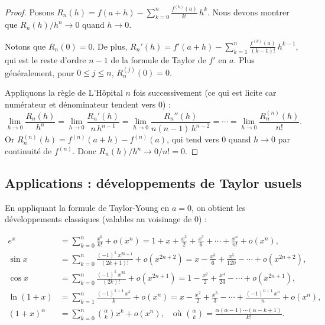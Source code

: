 \documentclass[12pt,a4paper,openany]{book}
\theoremstyle{definition}
\begin{document}
\begin{proof}
Posons $R_n(h) = f(a+h) - \displaystyle\sum_{k=0}^{n}\frac{f^{(k)}(a)}{k!}\,h^k$. Nous devons montrer que $R_n(h)/h^n \to 0$ quand $h \to 0$.

Notons que $R_n(0) = 0$. De plus, $R_n'(h) = f'(a+h) - \sum_{k=1}^{n}\frac{f^{(k)}(a)}{(k-1)!}\,h^{k-1}$, qui est le reste d'ordre $n-1$ de la formule de Taylor de $f'$ en $a$. Plus généralement, pour $0 \leqslant j \leqslant n$, $R_n^{(j)}(0) = 0$.

Appliquons la règle de L'Hôpital $n$ fois successivement (ce qui est licite car numérateur et dénominateur tendent vers $0$) :
\[
  \lim_{h \to 0} \frac{R_n(h)}{h^n}
  = \lim_{h \to 0} \frac{R_n'(h)}{n\,h^{n-1}}
  = \lim_{h \to 0} \frac{R_n''(h)}{n(n-1)\,h^{n-2}}
  = \cdots
  = \lim_{h \to 0} \frac{R_n^{(n)}(h)}{n!}.
\]
Or $R_n^{(n)}(h) = f^{(n)}(a+h) - f^{(n)}(a)$, qui tend vers $0$ quand $h \to 0$ par continuité de $f^{(n)}$. Donc $R_n(h)/h^n \to 0/n! = 0$.
\end{proof}

\subsection{Applications : développements de Taylor usuels}\label{subsec:DL-usuels}

En appliquant la formule de Taylor-Young en $a = 0$, on obtient les développements classiques (valables au voisinage de $0$) :

\begin{align}
  e^x &= \sum_{k=0}^{n} \frac{x^k}{k!} + o(x^n)
  = 1 + x + \frac{x^2}{2} + \frac{x^3}{6} + \cdots + \frac{x^n}{n!} + o(x^n), \label{eq:DL-exp} \\[6pt]
  \sin x &= \sum_{k=0}^{n} \frac{(-1)^k\,x^{2k+1}}{(2k+1)!} + o(x^{2n+2})
  = x - \frac{x^3}{6} + \frac{x^5}{120} - \cdots + o(x^{2n+2}), \label{eq:DL-sin} \\[6pt]
  \cos x &= \sum_{k=0}^{n} \frac{(-1)^k\,x^{2k}}{(2k)!} + o(x^{2n+1})
  = 1 - \frac{x^2}{2} + \frac{x^4}{24} - \cdots + o(x^{2n+1}), \label{eq:DL-cos} \\[6pt]
  \ln(1+x) &= \sum_{k=1}^{n} \frac{(-1)^{k+1}\,x^k}{k} + o(x^n)
  = x - \frac{x^2}{2} + \frac{x^3}{3} - \cdots + \frac{(-1)^{n+1}\,x^n}{n} + o(x^n), \label{eq:DL-ln} \\[6pt]
  (1+x)^\alpha &= \sum_{k=0}^{n} \binom{\alpha}{k} x^k + o(x^n), \quad
  \text{où } \binom{\alpha}{k} = \frac{\alpha(\alpha-1)\cdots(\alpha-k+1)}{k!}. \label{eq:DL-puissance}
\end{align}
\end{document}
